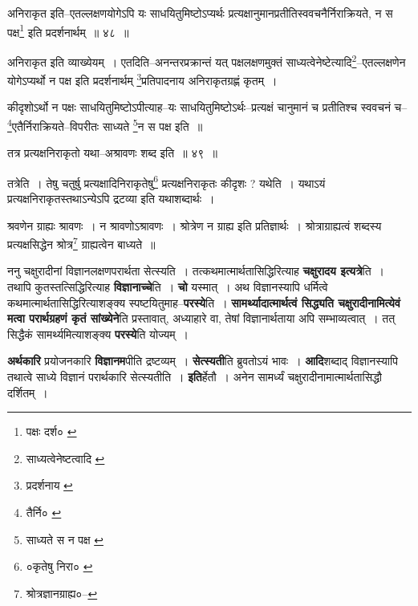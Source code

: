 \documentclass[article,12pt,a4paper]{memoir}
\begin{document}
	  \pstart अनिराकृत इति--एतल्लक्षणयोगेऽपि यः साधयितुमिष्टोऽप्यर्थः प्रत्यक्षानुमानप्रतीतिस्ववचनैर्निराक्रियते, न स पक्ष\footnote{पक्षः दर्श० \cite{dp-msC}} इति प्रदर्शनार्थम् ॥ ४८ ॥
	\pend
      
	  \endgroup
	
	  \bigskip
	  \begingroup
	

	  \pstart अनिराकृत इति व्याख्येयम् । एतदिति--अनन्तरप्रक्रान्तं यत् पक्षलक्षणमुक्तं साध्यत्वेनेष्टेत्यादि\footnote{साध्यत्वेनेष्टत्वादि \cite{dp-msC} \cite{dp-msD}}--एतल्लक्षणेन योगेऽप्यर्थो न पक्ष इति प्रदर्शनार्थम् \footnote{प्रदर्शनाय \cite{dp-msA} \cite{dp-msC} \cite{dp-edP} \cite{dp-edH}}प्रतिपादनाय अनिराकृतग्रह्णं कृतम् ।
	\pend
       

	  \pstart कीदृशोऽर्थो न पक्षः साधयितुमिष्टोऽपीत्याह--यः साधयितुमिष्टोऽर्थः--प्रत्यक्षं चानुमानं च प्रतीतिश्च स्ववचनं च--\footnote{तैर्नि० \cite{dp-edE} \cite{dp-edN}}एतैर्निराक्रियते--विपरीतः साध्यते \footnote{साध्यते स न पक्ष \cite{dp-msB} \cite{dp-msD}}न स पक्ष इति ॥
	\pend
       
	  \bigskip
	  \begingroup
	

	  \pstart तत्र प्रत्यक्षनिराकृतो यथा--अश्रावणः शब्द इति ॥ ४९ ॥
	\pend
      
	  \endgroup
	 

	  \pstart तत्रेति । तेषु चतुर्षु प्रत्यक्षादिनिराकृतेषु\footnote{०कृतेषु निरा० \cite{dp-msB}} प्रत्यक्षनिराकृतः कीदृशः ? यथेति । यथाऽयं प्रत्यक्षनिराकृतस्तथाऽन्येऽपि द्रटव्या इति यथाशब्दार्थः ।
	\pend
       

	  \pstart श्रवणेन ग्राह्यः श्रावणः । न श्रावणोऽश्रावणः । श्रोत्रेण न ग्राह्य इति प्रतिज्ञार्थः । श्रोत्राग्राह्यत्वं शब्दस्य प्रत्यक्षसिद्धेन श्रोत्र\footnote{श्रोत्रज्ञानग्राह्य०--\cite{dp-msD-n}} ग्राह्यत्वेन बाध्यते ॥
	\pend
      
	  \endgroup
	

	  \pstart ननु चक्षुरादीनां विज्ञानलक्षणपरार्थता सेत्स्यति । तत्कथमात्मार्थतासिद्धिरित्याह \textbf{चक्षुरादय इत्यत्रे}ति । तथापि कुतस्तत्सिद्धिरित्याह \textbf{विज्ञानाच्चे}ति । \textbf{चो} यस्मात् । अथ विज्ञानस्यापि धर्मित्वे कथमात्मार्थतासिद्धिरित्याशङ्क्य स्पष्टयितुमाह--\textbf{परस्ये}ति । \textbf{सामर्थ्यादात्मार्थत्वं सिद्ध्यति चक्षुरादीनामित्येवं मत्वा परार्थग्रहणं कृतं सांख्येने}ति प्रस्तावात्, अध्याहारे वा, तेषां विज्ञानार्थताया अपि सम्भाव्यत्वात् । तत् सिद्धैकं सामर्थ्यमित्याशङ्क्य \textbf{परस्ये}ति योज्यम् ।
	\pend
      

	  \pstart \textbf{अर्थकारि} प्रयोजनकारि \textbf{विज्ञानम}पीति द्रष्टव्यम् । \textbf{सेत्स्यती}ति ब्रुवतोऽयं भावः । \textbf{आदि}शब्दाद् विज्ञानस्यापि तथात्वे साध्ये विज्ञानं परार्थकारि सेत्स्यतीति । \textbf{इति}र्हेतौ । अनेन सामर्ध्यं चक्षुरादीनामात्मार्थतासिद्धौ दर्शितम् ।
	\pend
      
\end{document}
